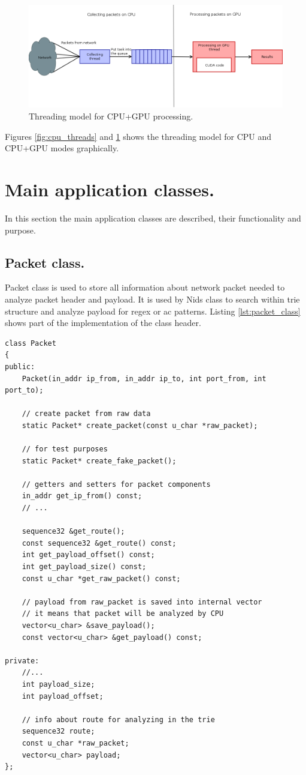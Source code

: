 \documentclass[thesis=M,english]{FITthesis}[2011/07/15]
\begin{document}
\begin{figure}
\centering
\includegraphics[scale=0.3]{images/gpu_threads.png}
\caption{Threading model for CPU+GPU processing.}
\label{fig:gpu_threads}
\end{figure}

Figures \ref{fig:cpu_threads} and \ref{fig:gpu_threads} shows the threading model for CPU and CPU+GPU modes graphically.

\section{Main application classes.}
In this section the main application classes are described, their functionality and purpose.

\subsection{Packet class.}
Packet class is used to store all information about network packet needed to analyze packet header and payload. It is used by Nids class to search within trie structure and analyze payload for regex or ac patterns. Listing \ref{lst:packet_class} shows part of the implementation of the class header.

\begin{lstlisting}
class Packet
{
public:
    Packet(in_addr ip_from, in_addr ip_to, int port_from, int port_to);

    // create packet from raw data
    static Packet* create_packet(const u_char *raw_packet);

    // for test purposes
    static Packet* create_fake_packet();

    // getters and setters for packet components
    in_addr get_ip_from() const;
    // ...

    sequence32 &get_route();
    const sequence32 &get_route() const;
    int get_payload_offset() const;
    int get_payload_size() const;
    const u_char *get_raw_packet() const;

    // payload from raw_packet is saved into internal vector
    // it means that packet will be analyzed by CPU
    vector<u_char> &save_payload();
    const vector<u_char> &get_payload() const;

private:
    //...
    int payload_size;
    int payload_offset;

    // info about route for analyzing in the trie
    sequence32 route;
    const u_char *raw_packet;
    vector<u_char> payload;
};
\end{lstlisting}
\end{document}

